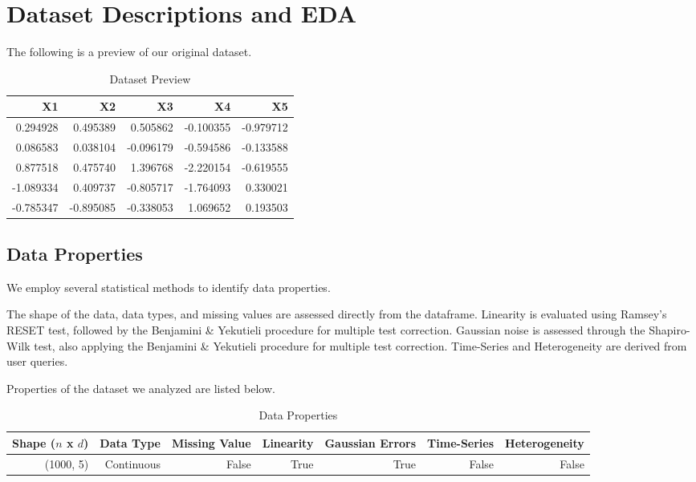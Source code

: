 \documentclass{article}
\begin{document}
\section{Dataset Descriptions and EDA}
The following is a preview of our original dataset.

\begin{table}[H]
    \centering
    \caption{Dataset Preview}
    \begin{tabular}{rrrrr}
\toprule
       X1 &        X2 &        X3 &        X4 &        X5 \\
\midrule
 0.294928 &  0.495389 &  0.505862 & -0.100355 & -0.979712 \\
 0.086583 &  0.038104 & -0.096179 & -0.594586 & -0.133588 \\
 0.877518 &  0.475740 &  1.396768 & -2.220154 & -0.619555 \\
-1.089334 &  0.409737 & -0.805717 & -1.764093 &  0.330021 \\
-0.785347 & -0.895085 & -0.338053 &  1.069652 &  0.193503 \\
\bottomrule
\end{tabular}

\end{table}

\subsection{Data Properties}
We employ several statistical methods to identify data properties.

The shape of the data, data types, and missing values are assessed directly from the dataframe. Linearity is evaluated using Ramsey’s RESET test, followed by the Benjamini \& Yekutieli procedure for multiple test correction. Gaussian noise is assessed through the Shapiro-Wilk test, also applying the Benjamini \& Yekutieli procedure for multiple test correction. Time-Series and Heterogeneity are derived from user queries.

Properties of the dataset we analyzed are listed below.

\begin{table}[H]
    \centering
    \caption{Data Properties}

    \begin{tabular}{rrrrrrr}
    \toprule
    Shape ($n$ x $d$) & Data Type & Missing Value & Linearity & Gaussian Errors & Time-Series & Heterogeneity \\
    \midrule
    (1000, 5)   & Continuous & False & True & True & False & False \\
    \bottomrule
    \end{tabular}
        
\end{table}
\end{document}

